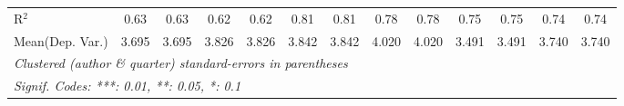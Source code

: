 \begin{tabular}{lcccccccccccc}
   R$^2$                                    & 0.63          & 0.63         & 0.62          & 0.62         & 0.81    & 0.81    & 0.78    & 0.78    & 0.75    & 0.75    & 0.74         & 0.74\\  
Mean(Dep. Var.) & 3.695 & 3.695 & 3.826 & 3.826 & 3.842 & 3.842 & 4.020 & 4.020 & 3.491 & 3.491 & 3.740 & 3.740 \\
   \midrule \midrule
   \multicolumn{13}{l}{\emph{Clustered (author \& quarter) standard-errors in parentheses}}\\
   \multicolumn{13}{l}{\emph{Signif. Codes: ***: 0.01, **: 0.05, *: 0.1}}\\
\end{tabular}
\par\endgroup
